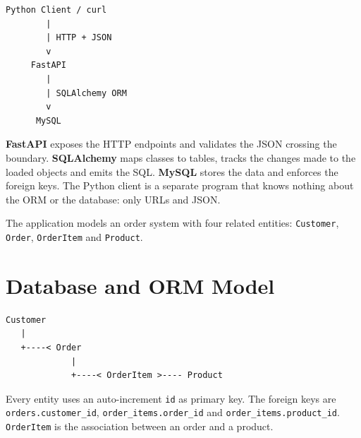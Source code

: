 \documentclass[10pt,a4paper]{article}
\begin{document}
\noindent
\begin{minipage}[t]{0.42\textwidth}
\begin{lstlisting}[style=plain]
Python Client / curl
        |
        | HTTP + JSON
        v
     FastAPI
        |
        | SQLAlchemy ORM
        v
      MySQL
\end{lstlisting}
\end{minipage}\hfill
\begin{minipage}[t]{0.55\textwidth}
\vspace{0.3cm}
\textbf{FastAPI} exposes the HTTP endpoints and validates the JSON crossing the
boundary. \textbf{SQLAlchemy} maps classes to tables, tracks the changes made to
the loaded objects and emits the SQL. \textbf{MySQL} stores the data and
enforces the foreign keys. The Python client is a separate program that knows
nothing about the ORM or the database: only URLs and JSON.

The application models an order system with four related entities:
\texttt{Customer}, \texttt{Order}, \texttt{OrderItem} and \texttt{Product}.
\end{minipage}

\section{Database and ORM Model}

\noindent
\begin{minipage}[t]{0.40\textwidth}
\begin{lstlisting}[style=plain]
Customer
   |
   +----< Order
             |
             +----< OrderItem >---- Product
\end{lstlisting}
\end{minipage}\hfill
\begin{minipage}[t]{0.57\textwidth}
\vspace{0.2cm}
\footnotesize
Every entity uses an auto-increment \texttt{id} as primary key. The foreign
keys are \texttt{orders.customer\_id}, \texttt{order\_items.order\_id} and
\texttt{order\_items.product\_id}. \texttt{OrderItem} is the association
between an order and a product.
\normalsize
\end{minipage}
\end{document}
